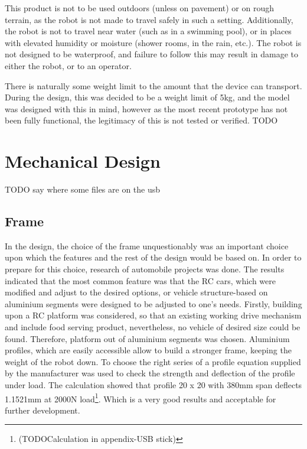\documentclass[11pt]{article}
\begin{document}
This product is not to be used outdoors (unless on pavement) or on rough terrain, as the robot is not made to travel safely in such a setting. Additionally, the robot is not to travel near water (such as in a swimming pool), or in places with elevated humidity or moisture (shower rooms, in the rain, etc.). The robot is not designed to be waterproof, and failure to follow this may result in damage to either the robot, or to an operator.

There is naturally some weight limit to the amount that the device can transport. During the design, this was decided to be a weight limit of 5kg, and the model was designed with this in mind, however as the most recent prototype has not been fully functional, the legitimacy of this is not tested or verified.
TODO
\newpage
\section{Mechanical Design}
TODO say where some files are on the usb
\subsection*{Frame}
In the design, the choice of the frame unquestionably was an important choice upon which the features and the rest of the design would be based on. In order to prepare for this choice, research of automobile projects was done. The results indicated that the most common feature was that the RC cars, which were modified and adjust to the desired options, or vehicle structure-based on aluminium segments were designed to be adjusted to one's needs. Firstly, building upon a RC platform was considered, so that an existing working drive mechanism and include food serving product, nevertheless, no vehicle of desired size could be found. Therefore, platform out of aluminium segments was chosen. Aluminium profiles, which are easily accessible allow to build a stronger frame, keeping the weight of the robot down. To choose the right series of a profile equation supplied by the manufacturer was used to check the strength and deflection of the profile under load. The calculation showed that profile 20 x 20 with 380mm span deflects 1.1521mm at 2000N load\footnote{(TODOCalculation in appendix-USB stick)}. Which is a very good results and acceptable for further development.
\end{document}
